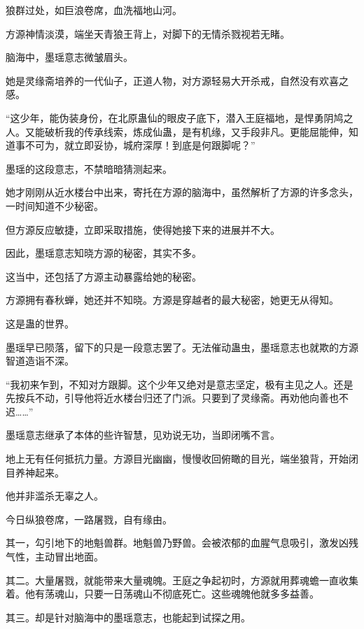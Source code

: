 
\begin{this_body}



狼群过处，如巨浪卷席，血洗福地山河。

方源神情淡漠，端坐天青狼王背上，对脚下的无情杀戮视若无睹。

脑海中，墨瑶意志微皱眉头。

她是灵缘斋培养的一代仙子，正道人物，对方源轻易大开杀戒，自然没有欢喜之感。

“这少年，能伪装身份，在北原蛊仙的眼皮子底下，潜入王庭福地，是悍勇阴鸠之人。又能破析我的传承线索，炼成仙蛊，是有机缘，又手段非凡。更能屈能伸，知道事不可为，就立即妥协，城府深厚！到底是何跟脚呢？”

墨瑶的这段意志，不禁暗暗猜测起来。

她才刚刚从近水楼台中出来，寄托在方源的脑海中，虽然解析了方源的许多念头，一时间知道不少秘密。

但方源反应敏捷，立即采取措施，使得她接下来的进展并不大。

因此，墨瑶意志知晓方源的秘密，其实不多。

这当中，还包括了方源主动暴露给她的秘密。

方源拥有春秋蝉，她还并不知晓。方源是穿越者的最大秘密，她更无从得知。

这是蛊的世界。

墨瑶早已陨落，留下的只是一段意志罢了。无法催动蛊虫，墨瑶意志也就欺的方源智道造诣不深。

“我初来乍到，不知对方跟脚。这个少年又绝对是意志坚定，极有主见之人。还是先按兵不动，引导他将近水楼台归还了门派。只要到了灵缘斋。再劝他向善也不迟……”

墨瑶意志继承了本体的些许智慧，见劝说无功，当即闭嘴不言。

地上无有任何抵抗力量。方源目光幽幽，慢慢收回俯瞰的目光，端坐狼背，开始闭目养神起来。

他并非滥杀无辜之人。

今日纵狼卷席，一路屠戮，自有缘由。

其一，勾引地下的地魁兽群。地魁兽乃野兽。会被浓郁的血腥气息吸引，激发凶残气性，主动冒出地面。

其二。大量屠戮，就能带来大量魂魄。王庭之争起初时，方源就用葬魂蟾一直收集着。他有荡魂山，只要一日荡魂山不彻底死亡。这些魂魄他就多多益善。

其三。却是针对脑海中的墨瑶意志，也能起到试探之用。


\end{this_body}
